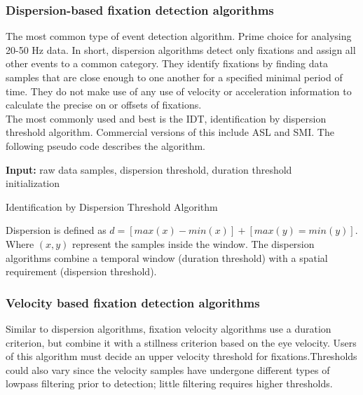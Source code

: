 \documentclass[12pt]{article}
\theoremstyle{definition}
\begin{document}
\subsubsection{Dispersion-based fixation detection algorithms}
The most common type of event detection algorithm. Prime choice for analysing 20-50 Hz data. In short, dispersion algorithms detect only fixations and assign all other events to a common category. They identify fixations by finding data samples that are close enough to one another for a specified minimal period of time. They do not make use of any use of velocity or acceleration information to calculate the precise on or offsets of fixations.\\

The most commonly used and best is the IDT, identification by dispersion threshold algorithm. Commercial versions of this include ASL and SMI. The following pseudo code describes the algorithm.  

\begin{algorithm}[H]
\SetAlgoLined
\textbf{Input:} raw data samples, dispersion threshold, duration threshold\\
 initialization\;
 
 \caption{Identification by Dispersion Threshold Algorithm}
\end{algorithm}

Dispersion is defined as $d = [max(x) - min(x)] + [max(y) = min(y)]$. Where $(x,y)$ represent the samples inside the window. The dispersion algorithms combine a temporal window (duration threshold) with a spatial requirement (dispersion threshold).

\subsubsection{Velocity based fixation detection algorithms}
Similar to dispersion algorithms, fixation velocity algorithms use a duration criterion, but combine it with a stillness criterion based on the eye velocity. Users of this algorithm must decide an upper velocity threshold for fixations.Thresholds could also vary since the velocity samples have undergone different types of lowpass filtering prior to detection; little filtering requires higher thresholds. \\
\end{document}
